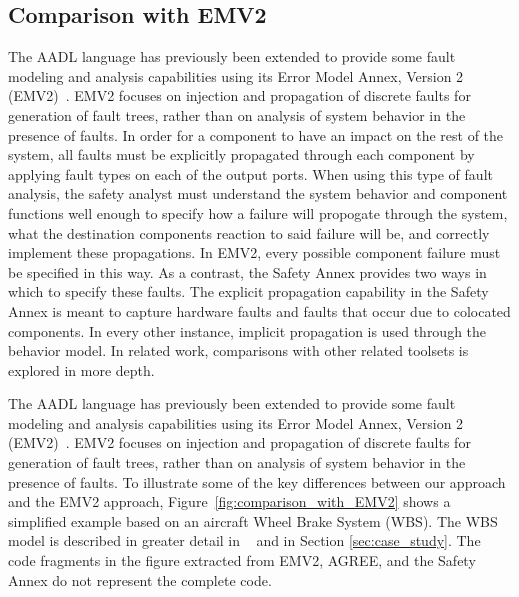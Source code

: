 \subsection{Comparison with EMV2}
\label{subsec:comparison_with_EMV2}

The AADL language has previously been extended to provide some fault modeling and analysis capabilities using its Error Model Annex, Version 2 (EMV2)~\cite{EMV2}.  EMV2 focuses on injection and propagation of discrete faults for generation of fault trees, rather than on analysis of system behavior in the presence of faults. In order for a component to have an impact on the rest of the system, all faults must be explicitly propagated through each component by applying fault types on each of the output ports. When using this type of fault analysis, the safety analyst must understand the system  behavior and component functions well enough to specify how a failure will propogate through the system, what the destination components reaction to said failure will be, and correctly implement these propagations. In EMV2, every possible component failure must be specified in this way. As a contrast, the Safety Annex provides two ways in which to specify these faults. The explicit propagation capability in the Safety Annex is meant to capture hardware faults and faults that occur due to colocated components. In every other instance, implicit propagation is used through the behavior model. In related work, comparisons with other related toolsets is explored in more depth. 














\iffalse

The AADL language has previously been extended to provide some fault modeling and analysis capabilities using its Error Model Annex, Version 2 (EMV2)~\cite{EMV2}.  EMV2 focuses on injection and propagation of discrete faults for generation of fault trees, rather than on analysis of system behavior in the presence of faults. 
To illustrate some of the key differences between our approach and the EMV2 approach, Figure~\ref{fig:comparison_with_EMV2} shows a simplified example based on an aircraft Wheel Brake System (WBS). The WBS model is described in greater detail in ~\cite{Stewart17:IMBSA} and in Section \ref{sec:case_study}. The code fragments in the figure extracted from EMV2, AGREE, and the Safety Annex do not represent the complete code.

